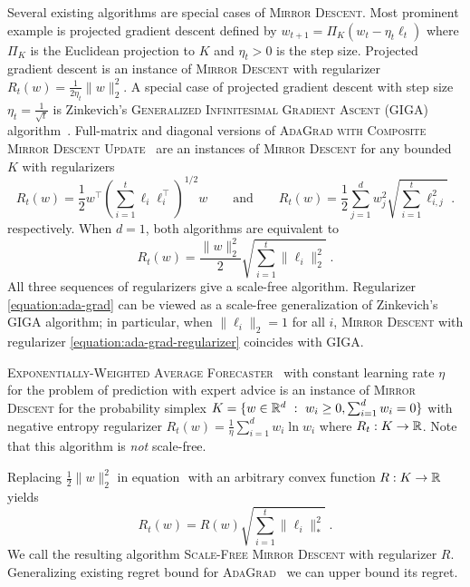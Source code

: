 Several existing algorithms are special cases of \textsc{Mirror Descent}. Most
prominent example is projected gradient descent defined by $w_{t+1} = \Pi_K(w_t
- \eta_t \ell_t)$ where $\Pi_K$ is the Euclidean projection to $K$ and
$\eta_t>0$ is the step size.  Projected gradient descent is an instance of
\textsc{Mirror Descent} with regularizer $R_t(w) = \frac{1}{2\eta_t}\|w\|_2^2$.
A special case of projected gradient descent with step size $\eta_t =
\frac{1}{\sqrt{t}}$ is Zinkevich's \textsc{Generalized Infinitesimal Gradient
Ascent} (GIGA) algorithm~\cite{Zinkevich-2003}. Full-matrix and diagonal
versions of \textsc{AdaGrad with Composite Mirror Descent
Update}~\cite{Duchi-Hazan-Singer-2011} are an instances of \textsc{Mirror
Descent} for any bounded $K$ with regularizers
$$
R_t(w) = \frac{1}{2} w^\top \left(\sum_{i=1}^t \ell_i \ell_i^\top \right)^{1/2} \!\!\!\! w
\qquad \text{and} \qquad
R_t(w) = \frac{1}{2} \sum_{j=1}^d w_j^2 \sqrt{ \sum_{i=1}^t \ell_{i,j}^2} \; .
$$
respectively. When $d=1$, both algorithms are equivalent to
\begin{equation}
\label{equation:ada-grad-regularizer}
R_t(w) = \frac{\|w\|_2^2}{2} \sqrt{\sum_{i=1}^t \|\ell_i\|_2^2 } \; .
\end{equation}
All three sequences of regularizers give a scale-free algorithm. Regularizer
\eqref{equation:ada-grad} can be viewed as a scale-free generalization of
Zinkevich's GIGA algorithm; in particular, when $\|\ell_i\|_2 = 1$ for all $i$,
\textsc{Mirror Descent} with regularizer \eqref{equation:ada-grad-regularizer}
coincides with GIGA.

\textsc{Exponentially-Weighted Average Forecaster}~\cite[Chapter
2]{Cesa-Bianchi-Lugosi-2006} with constant learning rate $\eta$ for the problem
of prediction with expert advice is an instance of \textsc{Mirror Descent} for
the probability simplex $K = \{ w \in \mathbb{R}^d ~:~ w_i \ge 0, \sum_{i=1}^d w_i = 0
\}$ with negative entropy regularizer $R_t(w) = \frac{1}{\eta} \sum_{i=1}^d w_i
\ln w_i$ where $R_t:K \to \mathbb{R}$. Note that this algorithm is \emph{not}
scale-free.

Replacing $\frac{1}{2}\|w\|_2^2$ in equation $\label{equation:ada-grad}$ with
an arbitrary convex function $R:K \to \mathbb{R}$ yields
\begin{equation}
\label{equation:scale-free-mirror-descent}
R_t(w) = R(w) \sqrt{\sum_{i=1}^t \|\ell_i\|_*^2} \; .
\end{equation}
We call the resulting algorithm \textsc{Scale-Free Mirror Descent} with
regularizer $R$.  Generalizing existing regret bound for
\textsc{AdaGrad}~\cite{Duchi-Hazan-Singer-2011} we can upper bound its regret.

